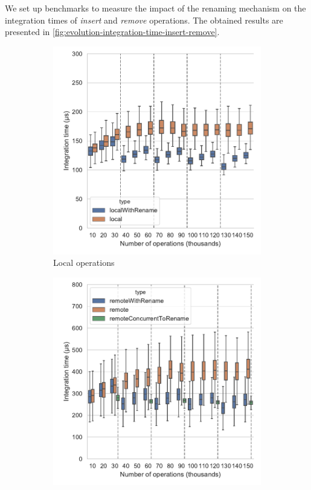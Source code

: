 \documentclass[sigplan,10pt]{acmart}
\begin{document}
\begin{sloppypar}
We set up benchmarks to measure the impact of the renaming mechanism on the integration times of \emph{insert} and \emph{remove} operations.
The obtained results are presented in \autoref{fig:evolution-integration-time-insert-remove}.
\end{sloppypar}

\begin{figure}
    \begin{subfigure}{\columnwidth}
        \centering
        \includegraphics[width=0.9\columnwidth]{img/integration-time-boxplot-local-operations-without-outliers.pdf}
        \caption{Local operations}
        \label{fig:evolution-integration-time-local-insert-remove}
    \end{subfigure}
    \begin{subfigure}{\columnwidth}
        \centering
        \includegraphics[width=0.9\columnwidth]{img/integration-time-boxplot-remote-operations-without-outliers.pdf}

\end{subfigure}
\end{figure}
\end{document}
